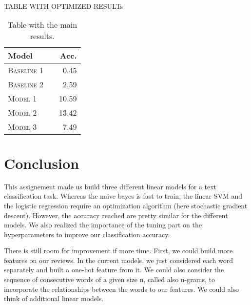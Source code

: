 \documentclass[11pt]{article}
\begin{document}
TABLE WITH OPTIMIZED RESULTs


\begin{table}[h]
\centering
\begin{tabular}{llr}
 \toprule
 Model &  & Acc. \\
 \midrule
 \textsc{Baseline 1} & & 0.45\\
 \textsc{Baseline 2} & & 2.59 \\
 \textsc{Model 1} & & 10.59  \\
 \textsc{Model 2} & &13.42 \\
 \textsc{Model 3} & & 7.49\\
 \bottomrule
\end{tabular}
\caption{\label{tab:results} Table with the main results.}
\end{table}



\section{Conclusion}


This assignement made us build three different linear models for a text classification task. Whereas the naive bayes is fast to train, the linear SVM and the logistic regression require an optimization algorithm (here stochastic gradient descent). However, the accuracy reached are pretty similar for the different models. We also realized the importance of the tuning part on the hyperparameters to improve our classification accuracy.

There is still room for improvement if more time. First, we could build more features on our reviews. In the current models, we just considered each word separately and built a one-hot feature from it. We could also consider the sequence of consecutive words of a given size n, called also n-grams, to incorporate the relationships between the words to our features. We could also think of additional linear models.



\end{document}
